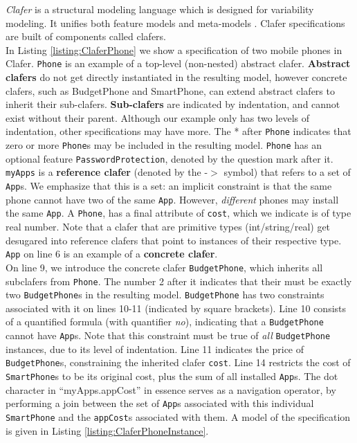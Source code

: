 \documentclass{easychair}
\newcommand{\eg}{\emph{e.g.}\xspace}
\begin{document}
\emph{Clafer} is a structural modeling language which is designed for variability modeling. It unifies both feature models  and meta-models \cite{BakClaferSLE2010}. Clafer specifications are built of components called clafers. \\
%
\indent In Listing \ref{listing:ClaferPhone}  we show a specification of two mobile phones in Clafer. 
%
 \texttt{Phone} is an example of a top-level (non-nested) abstract clafer. \textbf{Abstract clafers} do not get directly instantiated in the resulting model, however concrete clafers, such as BudgetPhone and SmartPhone, can extend abstract clafers to inherit their sub-clafers. \textbf{Sub-clafers} are indicated by indentation, and cannot exist without their parent. Although our example only has two levels of indentation, other specifications may have more. The * after \texttt{Phone} indicates that zero or more \texttt{Phone}s may be included in the resulting model. \texttt{Phone} has an optional feature \texttt{PasswordProtection}, denoted by the question mark after it. \texttt{myApps} is a \textbf{reference clafer} (denoted by the  -$>$ symbol) that refers  to a set of \texttt{App}s. We emphasize that this is a set: an implicit constraint is that the same phone cannot have two of the same \texttt{App}. However, \textit{different} phones may install the same \texttt{App}. A \texttt{Phone}, has a final attribute of \texttt{cost}, which we indicate is of type real number. Note that a clafer that are primitive types (int/string/real) get desugared into reference clafers that point to instances of their respective type. \texttt{App} on line 6 is an example of a \textbf{concrete clafer}.\\
%
\indent On line 9, we introduce the concrete clafer \texttt{BudgetPhone}, which inherits all subclafers from \texttt{Phone}. The number 2 after it indicates that their must be exactly two \texttt{BudgetPhone}s in the resulting model. \texttt{BudgetPhone} has two constraints associated with it on lines 10-11 (indicated by square brackets). Line 10 consists of a quantified formula (with quantifier \textit{no}), indicating that a \texttt{BudgetPhone} cannot have \texttt{App}s. Note that this constraint must be true of \textit{all} \texttt{BudgetPhone} instances, due to its level of indentation. Line 11 indicates the price of \texttt{BudgetPhone}s, constraining the inherited clafer \texttt{cost}. Line 14 restricts the cost of \texttt{SmartPhone}s to be its original cost, plus the sum of all installed \texttt{App}s. The dot character in ``myApps.appCost''  in essence serves as a navigation operator, by performing a join between the set of \texttt{App}s associated with this individual \texttt{SmartPhone} and the \texttt{appCost}s associated with them. A model of the specification is given in Listing \ref{listing:ClaferPhoneInstance}.\\ %
\end{document}
